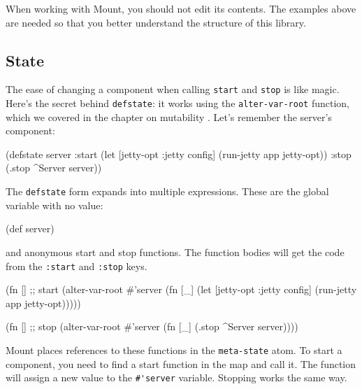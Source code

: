 When working with Mount, you should not edit its contents. The examples above are needed so that you better understand the structure of this library.

\subsection{State}


The ease of changing a component when calling \verb|start| and \verb|stop| is like magic. Here's the secret behind \verb|defstate|: it works using the \verb|alter-var-root| function, which we covered in the chapter on mutability . Let's remember the server's component:

\begin{english}
  \begin{clojure}
(defstate server
  :start
  (let [{jetty-opt :jetty} config]
    (run-jetty app jetty-opt))
  :stop
  (.stop ^Server server))
  \end{clojure}
\end{english}

The \verb|defstate| form expands  into multiple expressions. These are the global variable with no value:


\begin{english}
  \begin{clojure}
(def server)
  \end{clojure}
\end{english}

\noindent
and anonymous start and stop functions. The function bodies will get the code from the \verb|:start| and \verb|:stop| keys.

\begin{english}
  \begin{clojure}
(fn [] ;; start
  (alter-var-root #'server
   (fn [_]
     (let [{jetty-opt :jetty} config]
       (run-jetty app jetty-opt)))))

(fn [] ;; stop
  (alter-var-root #'server
   (fn [_]
     (.stop ^Server server))))
  \end{clojure}
\end{english}

Mount places references to these functions in the \verb|meta-state| atom. To start a component, you need to find a start function in the map and call it. The function will assign a new value to the \verb|#'server| variable. Stopping works the same way.

